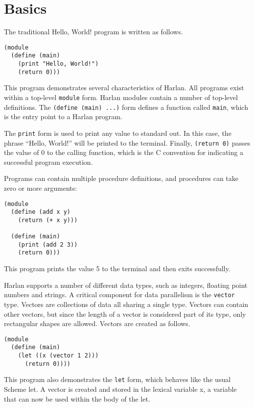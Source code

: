 \documentclass{book}
\begin{document}
\section{Basics}

The traditional Hello, World! program is written as follows.

\begin{lstlisting}
(module
  (define (main)
    (print "Hello, World!")
    (return 0)))
\end{lstlisting}

This program demonstrates several characteristics of Harlan. All
programs exist within a top-level \lstinline{module} form. Harlan
modules contain a number of top-level definitions. The
\lstinline{(define (main) ...)} form defines a function called
\lstinline{main}, which is the entry point to a Harlan program.

The \lstinline{print} form is used to print any value to standard
out. In this case, the phrase ``Hello, World!'' will be printed to the
terminal. Finally, \lstinline{(return 0)} passes the value of 0 to the
calling function, which is the C convention for indicating a
successful program execution.

Programs can contain multiple procedure definitions, and procedures
can take zero or more arguments:

\begin{lstlisting}
(module
  (define (add x y)
    (return (+ x y)))

  (define (main)
    (print (add 2 3))
    (return 0)))
\end{lstlisting}

This program prints the value 5 to the terminal and then exits
successfully.

Harlan supports a number of different data types, such as integers,
floating point numbers and strings. A critical component for data
parallelism is the \lstinline{vector} type. Vectors are collections of
data all sharing a single type. Vectors can contain other vectors, but
since the length of a vector is considered part of its type, only
rectangular shapes are allowed. Vectors are created as follows.

\begin{lstlisting}
(module
  (define (main)
    (let ((x (vector 1 2)))
      (return 0))))
\end{lstlisting}

This program also demonstrates the \lstinline{let} form, which behaves
like the usual Scheme let. A vector is created and stored in the lexical variable x, a variable that can now be used within the body of the let.
\end{document}
